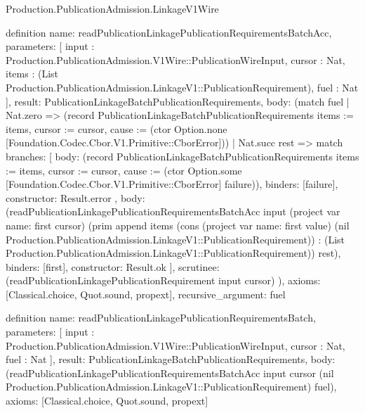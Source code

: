 \begin{lexlean}{Production.PublicationAdmission.LinkageV1Wire}
\begin{semanticmodule}
definition{
  name: readPublicationLinkagePublicationRequirementsBatchAcc,
  parameters: [
    input : Production.PublicationAdmission.V1Wire::PublicationWireInput,
    cursor : Nat,
    items : (List Production.PublicationAdmission.LinkageV1::PublicationRequirement),
    fuel : Nat
  ],
  result: PublicationLinkageBatchPublicationRequirements,
  body: (match fuel
    | Nat.zero => (record PublicationLinkageBatchPublicationRequirements {items := items, cursor := cursor, cause := (ctor Option.none [Foundation.Codec.Cbor.V1.Primitive::CborError])})
    | Nat.succ rest => match{
      branches: [
        {
          body: (record PublicationLinkageBatchPublicationRequirements {items := items, cursor := cursor, cause := (ctor Option.some [Foundation.Codec.Cbor.V1.Primitive::CborError] failure)}),
          binders: [failure],
          constructor: Result.error
        },
        {
          body: (readPublicationLinkagePublicationRequirementsBatchAcc input (project var{
            name: first
          } cursor) (prim append items (cons (project var{
            name: first
          } value) (nil Production.PublicationAdmission.LinkageV1::PublicationRequirement)) : (List Production.PublicationAdmission.LinkageV1::PublicationRequirement)) rest),
          binders: [first],
          constructor: Result.ok
        }
      ],
      scrutinee: (readPublicationLinkagePublicationRequirement input cursor)
    }),
  axioms: [Classical.choice, Quot.sound, propext],
  recursive_argument: fuel
}

definition{
  name: readPublicationLinkagePublicationRequirementsBatch,
  parameters: [
    input : Production.PublicationAdmission.V1Wire::PublicationWireInput,
    cursor : Nat,
    fuel : Nat
  ],
  result: PublicationLinkageBatchPublicationRequirements,
  body: (readPublicationLinkagePublicationRequirementsBatchAcc input cursor (nil Production.PublicationAdmission.LinkageV1::PublicationRequirement) fuel),
  axioms: [Classical.choice, Quot.sound, propext]
}


\end{semanticmodule}
\end{lexlean}
